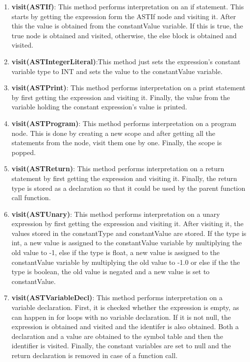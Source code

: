 \documentclass{article}
\begin{document}
\begin{enumerate}
							\item \textbf{visit(ASTIf)}: This method performs interpretation on an if statement. This starts by getting the expression form the ASTIf node and visiting it. After this the value is obtained from the constantValue variable. If this is true, the true node is obtained and visited, otherwise, the else block is obtained and visited.
							
					\item \textbf{visit(ASTIntegerLiteral)}:This method just sets the expression's constant variable type to INT and sets the value to the constantValue variable.
					
					\item \textbf{visit(ASTPrint)}: This method performs interpretation on a print statement by first getting the expression and visiting it. Finally, the value from the variable holding the constant expression's value is printed.
					
					\item \textbf{visit(ASTProgram)}: This method performs interpretation on a program node. This is done by creating a new scope and after getting all the statements from the node, visit them one by one. Finally, the scope is popped.
					
					\item \textbf{visit(ASTReturn)}: This method performs interpretation on a return statement by first getting the expression and visiting it. Finally, the return type is stored as a declaration so that it could be used by the parent function call function.
			
					\item \textbf{visit(ASTUnary)}: This method performs interpretation on a unary expression by first getting the expression and visiting it. After visiting it, the values stored in the constantType and constantValue are stored. If the type is int, a new value is assigned to the constantValue variable by multiplying the old value to -1, else if the type is float, a new value is assigned to the constantValue variable by multiplying the old value to -1.0 or else if the 
the type is boolean, the old value is negated and a new value is set to constantValue.

				\item \textbf{visit(ASTVariableDecl)}: This method performs interpretation on a variable declaration. First, it is checked whether the expression is empty, as can happen in for loops with no variable declaration. If it is not null, the expression is obtained and visited and the identifer is also obtained. Both a declaration and a value are obtained to the symbol table and then the identifier is visited. Finally, the constant variables are set to null and the return declaration is removed in case of a function call.
						

\end{enumerate}
\end{document}
